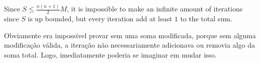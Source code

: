 Since $S \le \frac{n(n+1)}{2}M$, it is impossible to make an infinite amount
of iterations since $S$ is up bounded, but every iteration add at least $1$ to the total sum.

\begin{insight}
	Obviamente era impossível provar sem uma soma modificada, porque sem alguma modificação válida,
	a iteração não necessariamente adicionava ou removia algo da soma total. Logo, imediatamente
	poderia se imaginar em mudar isso.
\end{insight}
